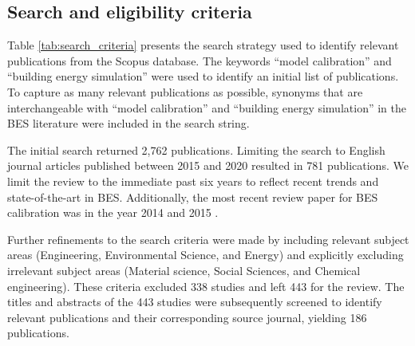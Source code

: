\documentclass[review]{elsarticle}
\begin{document}
\subsection{Search and eligibility criteria}

Table \ref{tab:search_criteria} presents the search strategy used to identify relevant publications from the Scopus database. The keywords ``model calibration'' and ``building energy simulation'' were used to identify an initial list of publications. To capture as many relevant publications as possible, synonyms that are interchangeable with ``model calibration'' and ``building energy simulation'' in the BES literature were included in the search string. 

The initial search returned 2,762 publications. Limiting the search to English journal articles published between 2015 and 2020 resulted in 781 publications. We limit the review to the immediate past six years to reflect recent trends and state-of-the-art in BES. Additionally, the most recent review paper for BES calibration was in the year 2014 \cite{coakley2014review} and 2015 \cite{fabrizio2015methodologies}. 

Further refinements to the search criteria were made by including relevant subject areas (Engineering, Environmental Science, and Energy) and explicitly excluding irrelevant subject areas (Material science, Social Sciences, and Chemical engineering). These criteria excluded 338 studies and left 443 for the review. The titles and abstracts of the 443 studies were subsequently screened to identify relevant publications and their corresponding source journal, yielding 186 publications. 
\end{document}
